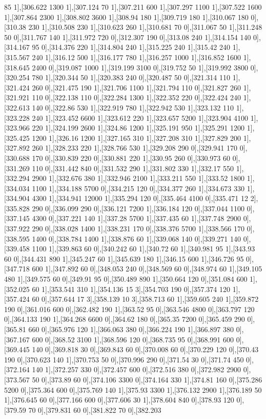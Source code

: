 {85 1],[306.622 1300 1],[307.124 70 1],[307.211 600 1],[307.297 1100 1],[307.522 1600 1],[307.864 2300 1],[308.802 3600 1],[308.94 180 1],[309.719 180 1],[310.067 180 0],[310.38 230 1],[310.508 230 1],[310.623 260 1],[310.681 70 0],[311.067 50 1],[311.248 50 0],[311.767 140 1],[311.972 720 0],[312.307 190 0],[313.08 240 1],[314.154 140 0],[314.167 95 0],[314.376 220 1],[314.804 240 1],[315.225 240 1],[315.42 240 1],[315.567 240 1],[316.12 500 1],[316.177 780 1],[316.257 1000 1],[316.852 1600 1],[318.645 2400 0],[319.087 1000 1],[319.199 3100 0],[319.752 50 1],[319.992 3800 0],[320.254 780 1],[320.344 50 1],[320.383 240 0],[320.487 50 0],[321.314 110 1],[321.424 260 0],[321.475 190 1],[321.706 1100 1],[321.794 110 0],[321.827 260 1],[321.921 110 0],[322.138 110 0],[322.284 1300 1],[322.352 220 0],[322.424 240 1],[322.613 140 0],[322.86 530 1],[322.919 780 1],[322.942 530 1],[323.132 110 1],[323.228 240 1],[323.452 6600 1],[323.612 220 1],[323.657 5200 1],[323.904 4100 1],[323.966 220 1],[324.199 2600 1],[324.86 1200 1],[325.191 950 1],[325.291 1200 1],[325.425 1200 1],[326.16 1200 1],[327.165 310 1],[327.208 310 1],[327.829 200 1],[327.892 260 1],[328.233 220 1],[328.766 530 1],[329.208 290 0],[329.941 170 0],[330.688 170 0],[330.839 220 0],[330.881 220 1],[330.95 260 0],[330.973 60 0],[331.269 110 0],[331.442 840 0],[331.532 290 1],[331.802 330 1],[332.17 550 1],[332.294 2900 1],[332.676 380 1],[332.946 2100 1],[333.211 550 1],[333.52 1800 1],[334.034 1100 1],[334.188 5700 0],[334.215 120 0],[334.377 260 1],[334.673 330 1],[334.904 4300 1],[334.941 12000 1],[335.294 120 0],[335.464 4100 0],[335.471 12 2],[335.828 290 0],[336.099 290 0],[336.121 7200 1],[336.184 120 0],[337.044 1100 0],[337.145 4300 0],[337.221 140 1],[337.28 5700 1],[337.435 60 1],[337.748 2900 0],[337.922 290 0],[338.028 1400 1],[338.231 170 0],[338.376 5700 1],[338.566 170 0],[338.595 1400 0],[338.784 1400 1],[338.876 60 1],[339.068 140 0],[339.271 140 0],[339.458 1100 1],[339.863 60 0],[340.242 60 1],[340.72 60 1],[340.981 95 1],[343.93 60 0],[344.431 890 1],[345.247 60 1],[345.639 180 1],[346.15 600 1],[346.726 95 0],[347.718 600 1],[347.892 60 0],[348.053 240 0],[348.569 60 0],[348.974 60 1],[349.105 480 1],[349.575 60 0],[349.91 95 0],[350.489 890 1],[350.664 120 0],[351.084 600 1],[352.025 60 1],[353.541 310 1],[354.136 15 3],[354.703 190 0],[357.374 120 1],[357.424 60 0],[357.644 17 3],[358.139 10 3],[358.713 60 1],[359.605 240 1],[359.872 190 0],[361.016 600 0],[362.482 190 1],[363.52 95 0],[363.546 4800 0],[363.797 120 0],[364.133 190 1],[364.268 6600 0],[364.62 180 0],[365.35 7200 0],[365.459 290 0],[365.81 660 0],[365.976 120 1],[366.063 380 0],[366.224 190 1],[366.897 380 0],[367.167 600 0],[368.52 3100 1],[368.596 120 0],[368.735 95 0],[368.991 600 0],[369.445 140 0],[369.818 30 0],[369.843 60 0],[370.008 60 0],[370.229 120 0],[370.43 190 0],[370.623 140 1],[370.753 50 0],[370.996 290 0],[371.54 30 0],[371.74 450 0],[372.164 140 1],[372.257 330 0],[372.457 600 0],[372.516 380 0],[372.982 2900 0],[373.567 50 0],[373.89 60 0],[374.106 3300 0],[374.164 330 1],[374.81 160 0],[375.286 5200 0],[375.364 600 0],[375.769 140 1],[375.93 3300 1],[376.132 2900 1],[376.189 50 1],[376.645 60 0],[377.166 600 0],[377.606 30 1],[378.604 840 0],[378.93 120 0],[379.59 70 0],[379.831 60 0],[381.822 70 0],[382.203 }
